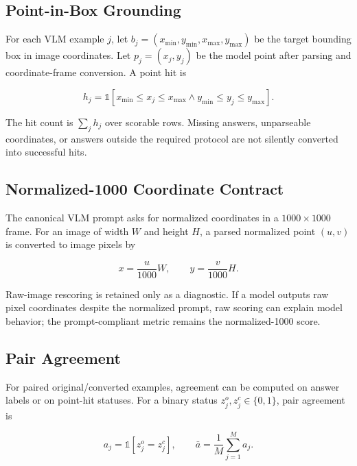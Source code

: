 \subsection{Point-in-Box Grounding}

For each VLM example $j$, let $b_j=(x_{\min},y_{\min},x_{\max},y_{\max})$ be
the target bounding box in image coordinates. Let $p_j=(x_j,y_j)$ be the model
point after parsing and coordinate-frame conversion. A point hit is

\begin{equation}
h_j =
\mathbb{1}\left[
x_{\min}\leq x_j \leq x_{\max}
\land
y_{\min}\leq y_j \leq y_{\max}
\right].
\end{equation}

The hit count is $\sum_j h_j$ over scorable rows. Missing answers, unparseable
coordinates, or answers outside the required protocol are not silently
converted into successful hits.

\subsection{Normalized-1000 Coordinate Contract}

The canonical VLM prompt asks for normalized coordinates in a $1000\times1000$
frame. For an image of width $W$ and height $H$, a parsed normalized point
$(u,v)$ is converted to image pixels by

\begin{equation}
x = \frac{u}{1000}W,\qquad y = \frac{v}{1000}H .
\end{equation}

Raw-image rescoring is retained only as a diagnostic. If a model outputs raw
pixel coordinates despite the normalized prompt, raw scoring can explain model
behavior; the prompt-compliant metric remains the normalized-1000 score.

\subsection{Pair Agreement}

For paired original/converted examples, agreement can be computed on answer
labels or on point-hit statuses. For a binary status $z_j^o,z_j^c\in\{0,1\}$,
pair agreement is

\begin{equation}
a_j = \mathbb{1}[z_j^o=z_j^c],
\qquad
\bar{a}=\frac{1}{M}\sum_{j=1}^{M}a_j .
\end{equation}

